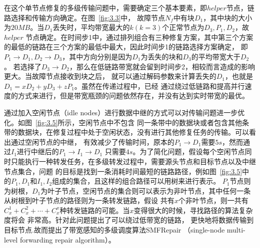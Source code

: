 在这个单节点修复的多级传输问题中，需要确定三个基本要素，即$helper$节点，链路选择和传输方向确定。在图~\ref{fig:3.3}中，
故障节点$N_f$中有块$D_1$，其中块的大小为$20MB$。当$D_1$丢失时，平均带宽最大的$k(k=3)$个正常节点为$D_3,P_1,D_2$，故$helper$
节点确定。在时间步1中，通过排列组合有三种修复方案，其中第三个方案的最低的链路在三个方案的最低中最大，因此时间步1的链路选择方案确定，
即$P_1\rightarrow D_1,D_2\rightarrow D_3$，其中方向分别是因为$D_1$为丢失的块和$D_3$的平均带宽大于$D_2$。
若选择了$D_3\rightarrow D_2$，那么在低链路带宽就会留到时间步2，相较而言造成的影响更大。当故障节点接收到块之后，
就可以通过解码参数来计算丢失的$D_1$，也就是$D_1=xD_2+yD_3+zP_1$。虽然在传递过程中，已经
通过绕过低链路和提高并行速度的方式来进行，但是带宽瓶颈的问题依然存在，并没有达到实时带宽的最优。

通过加入空闲节点（idle nodes）进行数据中继的方式可以对传输问题进一步优化。如图~\ref{fig:3.5}所示，空闲节点中不包含
同一条带中的数据块或者包含其他条带的数据块，在修复过程中处于空闲状态，没有进行其他修复任务的传输。可以看出通过空闲节点的中继，
有效减少了传输时间，原本的$P_1\rightarrow D_1$需要$5s$，然而通过$I_1$进行中继后的$P_1\rightarrow I_1 \rightarrow D_1$
只需要$4s$。为了简化问题，假设每个空闲节点同时只能执行一种转发任务，在多级转发过程中，需要源头节点和目标节点以及中继节点集合，问题
的目标是找到一条消耗时间最短的链路路径，例如图~\ref{fig:3.5}中的$P_1,D_1$和$I_1,I_2$组成的集合，且这样的组合路径可以用树来进行表示。
$P_1$节点则为树根，$D_1$为叶子节点，空闲节点的集合则可以表示为非叶节点，其中任何一条从树根到叶子节点的路径则为一条转发链路，假设
共有$x$个非叶节点，则一共有$C_{x}^{1}+C_{x}^{2}+\cdots+C_{x}^{x}$种转发链路的可能。当$x$变得很大的时候，寻找路径的算法复杂度将会
非常高。针对此问题\citet{zhou2022bandwidth}提出了可以绕过低带宽的链路，
更快地将数据传输到目标节点.故而提出了带宽感知的多级调度算法SMFRepair
（single-node multi-level forwarding repair algorithm）。

